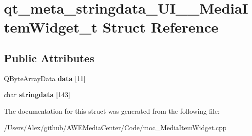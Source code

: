 \hypertarget{structqt__meta__stringdata___u_i_____media_item_widget__t}{\section{qt\-\_\-meta\-\_\-stringdata\-\_\-\-U\-I\-\_\-\-\_\-\-Media\-Item\-Widget\-\_\-t Struct Reference}
\label{structqt__meta__stringdata___u_i_____media_item_widget__t}
}
\subsection*{Public Attributes}
\begin{DoxyCompactItemize}
\item 
\hypertarget{structqt__meta__stringdata___u_i_____media_item_widget__t_a49efbfbaaf1b4020ce7ce005426c42fb}{Q\-Byte\-Array\-Data {\bfseries data} \mbox{[}11\mbox{]}}\label{structqt__meta__stringdata___u_i_____media_item_widget__t_a49efbfbaaf1b4020ce7ce005426c42fb}

\item 
\hypertarget{structqt__meta__stringdata___u_i_____media_item_widget__t_add349d25e8ca30d85d7ae60b4495dc97}{char {\bfseries stringdata} \mbox{[}143\mbox{]}}\label{structqt__meta__stringdata___u_i_____media_item_widget__t_add349d25e8ca30d85d7ae60b4495dc97}

\end{DoxyCompactItemize}


The documentation for this struct was generated from the following file\-:\begin{DoxyCompactItemize}
\item 
/\-Users/\-Alex/github/\-A\-W\-E\-Media\-Center/\-Code/moc\-\_\-\-Media\-Item\-Widget.\-cpp\end{DoxyCompactItemize}

